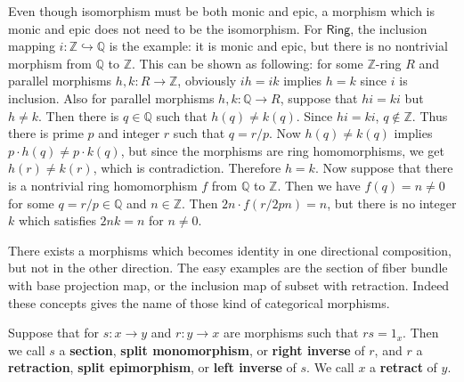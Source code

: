 Even though isomorphism must be both monic and epic, a morphism which is monic and epic does not need to be the isomorphism. For $\mathsf{Ring}$, the inclusion mapping $i:\mathbb{Z}\hookrightarrow \mathbb{Q}$ is the example: it is monic and epic, but there is no nontrivial morphism from $\mathbb{Q}$ to $\mathbb{Z}$. This can be shown as following: for some $\mathbb{Z}$-ring $R$ and parallel morphisms $h,k:R\rightarrow \mathbb{Z}$, obviously $ih=ik$ implies $h=k$ since $i$ is inclusion. Also for parallel morphisms $h,k:\mathbb{Q}\rightarrow R$, suppose that $hi=ki$ but $h\neq k$. Then there is $q\in \mathbb{Q}$ such that $h(q)\neq k(q)$. Since $hi=ki$, $q\notin \mathbb{Z}$. Thus there is prime $p$ and integer $r$ such that $q=r/p$. Now $h(q)\neq k(q)$ implies $p\cdot h(q)\neq p\cdot k(q)$, but since the morphisms are ring homomorphisms, we get $h(r)\neq k(r)$, which is contradiction. Therefore $h=k$. Now suppose that there is a nontrivial ring homomorphism $f$ from $\mathbb{Q}$ to $\mathbb{Z}$. Then we have $f(q)=n\neq 0$ for some $q=r/p\in \mathbb{Q}$ and $n\in \mathbb{Z}$. Then $2n\cdot f(r/2pn)=n$, but there is no integer $k$ which satisfies $2nk=n$ for $n\neq 0$.

There exists a morphisms which becomes identity in one directional composition, but not in the other direction. The easy examples are the section of fiber bundle with base projection map, or the inclusion map of subset with retraction. Indeed these concepts gives the name of those kind of categorical morphisms.
\begin{defn} Suppose that for $s:x\rightarrow y$ and $r:y\rightarrow x$ are morphisms such that $rs=1_x$. Then we call $s$ a \textbf{section}, \textbf{split monomorphism}, or \textbf{right inverse} of $r$, and $r$ a \textbf{retraction}, \textbf{split epimorphism}, or \textbf{left inverse} of $s$. We call $x$ a \textbf{retract} of $y$.
\end{defn}


